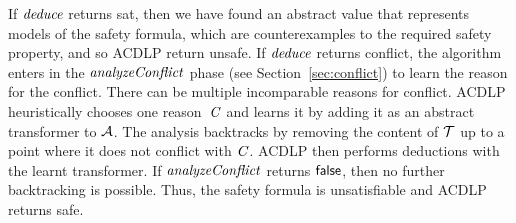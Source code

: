 If  $\mathit{deduce}$ returns  \textsf{sat}, then 
we have found an abstract value that represents models of the safety formula, which
are counterexamples to the required safety property, and so ACDLP return
\textsf{unsafe}.
%
%
If  $\mathit{deduce}$ returns  \textsf{conflict}, 
the algorithm enters in the $\mathit{analyzeConflict}$ 
phase (see Section~\ref{sec:conflict}) to learn the reason for the conflict.   There can be multiple
incomparable reasons for conflict.
ACDLP heuristically chooses one reason~$\mathit{C}$ and learns it 
by adding it as an abstract transformer to $\mathcal{A}$. The analysis 
backtracks by removing the content of $\mathcal{T}$ up to a point where it does not 
conflict with $\mathit{C}$.  ACDLP then performs deductions with the learnt 
transformer.  If $\mathit{analyzeConflict}$ returns $\mathsf{false}$, then no further
backtracking is possible.  Thus, the safety formula is unsatisfiable
and ACDLP returns \textsf{safe}.



